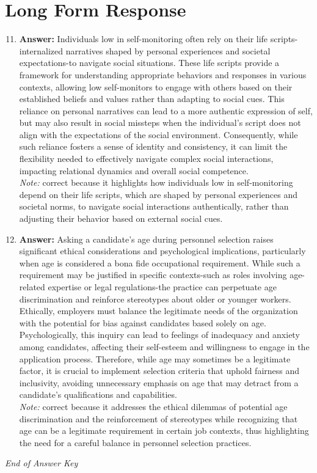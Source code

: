 \documentclass[12pt]{article}
\begin{document}
\section*{Long Form Response}
\begin{enumerate}[label=\arabic*.]
\setcounter{enumi}{10}
\item \textbf{Answer:} Individuals low in self-monitoring often rely on their life scripts-internalized narratives shaped by personal experiences and societal expectations-to navigate social situations. These life scripts provide a framework for understanding appropriate behaviors and responses in various contexts, allowing low self-monitors to engage with others based on their established beliefs and values rather than adapting to social cues. This reliance on personal narratives can lead to a more authentic expression of self, but may also result in social missteps when the individual's script does not align with the expectations of the social environment. Consequently, while such reliance fosters a sense of identity and consistency, it can limit the flexibility needed to effectively navigate complex social interactions, impacting relational dynamics and overall social competence.
\\ \textit{Note:} correct because it highlights how individuals low in self-monitoring depend on their life scripts, which are shaped by personal experiences and societal norms, to navigate social interactions authentically, rather than adjusting their behavior based on external social cues.
\item \textbf{Answer:} Asking a candidate's age during personnel selection raises significant ethical considerations and psychological implications, particularly when age is considered a bona fide occupational requirement. While such a requirement may be justified in specific contexts-such as roles involving age-related expertise or legal regulations-the practice can perpetuate age discrimination and reinforce stereotypes about older or younger workers. Ethically, employers must balance the legitimate needs of the organization with the potential for bias against candidates based solely on age. Psychologically, this inquiry can lead to feelings of inadequacy and anxiety among candidates, affecting their self-esteem and willingness to engage in the application process. Therefore, while age may sometimes be a legitimate factor, it is crucial to implement selection criteria that uphold fairness and inclusivity, avoiding unnecessary emphasis on age that may detract from a candidate's qualifications and capabilities.
\\ \textit{Note:} correct because it addresses the ethical dilemmas of potential age discrimination and the reinforcement of stereotypes while recognizing that age can be a legitimate requirement in certain job contexts, thus highlighting the need for a careful balance in personnel selection practices.
\end{enumerate}

\vfill
\noindent\textit{End of Answer Key}
\end{document}
